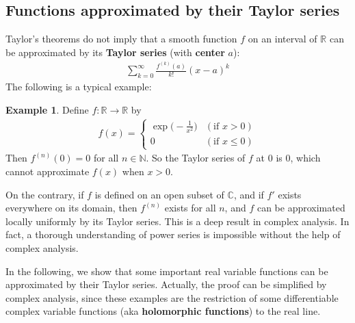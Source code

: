 \documentclass[12pt,b5paper,notitlepage]{article}
\theoremstyle{definition}
\newtheorem{eg}[df]{Example}
\theoremstyle{plain}
\newcommand{\Cbb}{\mathbb C}
\newcommand{\Nbb}{\mathbb N}
\newcommand{\Rbb}{\mathbb R}
\newcommand{\dps}{\displaystyle}
\numberwithin{equation}{section}
\begin{document}
\subsection{Functions approximated by their Taylor series}


Taylor's theorems do not imply that a smooth function $f$ on an interval of $\Rbb$ can be approximated by its \textbf{Taylor series}  (with \textbf{center} $a$):
\begin{align}
\sum_{k=0}^\infty \frac{f^{(k)}(a)}{k!}(x-a)^k
\end{align}
The following is a typical example:

\begin{eg}\label{lb358}
Define $f:\Rbb\rightarrow\Rbb$ by
\begin{align*}
f(x)=\left\{
\begin{array}{ll}
\dps \exp\big(-\frac 1{x^2}\big)& (\text{if }x>0)\\[1ex]
0&(\text{if }x\leq 0)
\end{array}
\right.
\end{align*}
Then $f^{(n)}(0)=0$ for all $n\in\Nbb$. So the Taylor series of $f$ at $0$ is $0$, which cannot approximate $f(x)$ when $x>0$.
\end{eg}


On the contrary, if $f$ is defined on an open subset of $\Cbb$, and if $f'$ exists everywhere on its domain, then $f^{(n)}$ exists for all $n$, and $f$ can be approximated locally uniformly by its Taylor series. This is a deep result in complex analysis. In fact, a thorough understanding of power series is impossible without the help of complex analysis.

In the following, we show that some important real variable functions can be approximated by their Taylor series. Actually, the proof can be simplified by complex analysis, since these examples are the restriction of some differentiable complex variable functions (aka \textbf{holomorphic functions}) to the real line.
\end{document}
